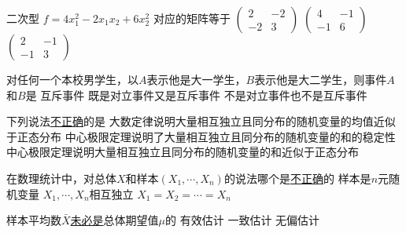 \documentclass[noanswer]{USTBExam}
\begin{document}
\begin{problem}
  二次型 $f = 4 x_1^2 - 2 x_1 x_2 + 6 x_2^2$ 对应的矩阵等于 
    {$\left(
        \begin{array}{cc}
          2   & - 2 \\
          - 2 & 3
        \end{array}
        \right)$}
    {$\left(
        \begin{array}{cc}
          4   & - 1 \\
          - 1 & 6
        \end{array}
        \right)$}
    {$\left(
        \begin{array}{cc}
          2   & - 1 \\
          - 1 & 3
        \end{array}
        \right)$}
\end{problem}


\begin{problem}
  对任何一个本校男学生，以$A$表示他是大一学生，$B$表示他是大二学生，则事件$A$和$B$是
    {互斥事件}
    {既是对立事件又是互斥事件}
    {不是对立事件也不是互斥事件}
\end{problem}


\begin{problem}
  下列说法\uline{不正确}的是
    {大数定律说明大量相互独立且同分布的随机变量的均值近似于正态分布}
    {中心极限定理说明了大量相互独立且同分布的随机变量的和的稳定性}
    {中心极限定理说明大量相互独立且同分布的随机变量的和近似于正态分布}
\end{problem}


\begin{problem}
  在数理统计中，对总体$X$和样本$(X_1,\cdots,X_n)$的说法哪个是\uline{不正确}的
    {样本是$n$元随机变量}
    {$X_1, \cdots, X_n$相互独立}
    {$X_1 = X_2 =\cdots = X_n$}
\end{problem}


\begin{problem}
  样本平均数$\bar{X}$\uline{未必是}总体期望值$\mu$的
    {有效估计}
    {一致估计}
    {无偏估计}
\end{problem}
\end{document}
